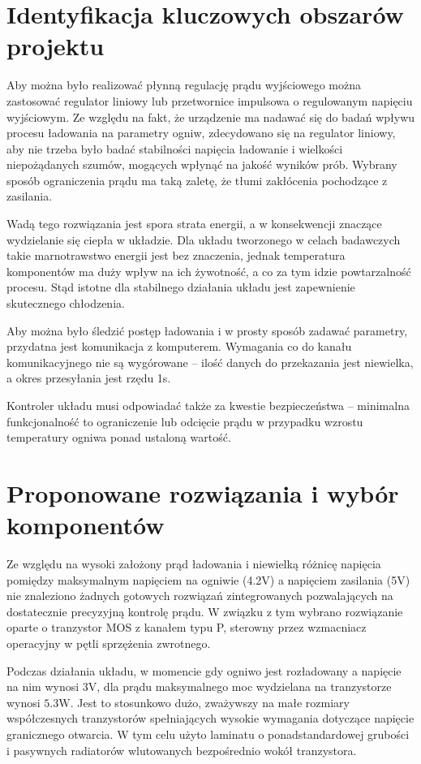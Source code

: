 \documentclass[polish,engineer]{polsl-msth}
\begin{document}
\section{Identyfikacja kluczowych obszarów projektu}
Aby można było realizować płynną regulację prądu wyjściowego można zastosować regulator liniowy lub przetwornice impulsowa o regulowanym napięciu wyjściowym. Ze względu na fakt, że urządzenie ma nadawać się do badań wpływu procesu ładowania na parametry ogniw, zdecydowano się na regulator liniowy, aby nie trzeba było badać stabilności napięcia ładowanie i wielkości niepożądanych szumów, mogących wpłynąć na jakość wyników prób. Wybrany sposób ograniczenia prądu ma taką zaletę, że tłumi zakłócenia pochodzące z zasilania.

Wadą tego rozwiązania jest spora strata energii, a w konsekwencji znaczące wydzielanie się ciepła w układzie. Dla układu tworzonego w celach badawczych takie marnotrawstwo energii jest bez znaczenia, jednak temperatura komponentów ma duży wpływ na ich żywotność, a co za tym idzie powtarzalność procesu. Stąd istotne dla stabilnego działania układu jest zapewnienie skutecznego chłodzenia.

Aby można było śledzić postęp ładowania i w prosty sposób zadawać parametry, przydatna jest komunikacja z komputerem. Wymagania co do kanału komunikacyjnego nie są wygórowane – ilość danych do przekazania jest niewielka, a okres przesyłania jest rzędu 1s.

Kontroler układu musi odpowiadać także za kwestie bezpieczeństwa – minimalna funkcjonalność to ograniczenie lub odcięcie prądu w przypadku wzrostu temperatury ogniwa ponad ustaloną wartość.

\section{Proponowane rozwiązania i wybór komponentów}
Ze względu na wysoki założony prąd ładowania i niewielką różnicę napięcia pomiędzy maksymalnym napięciem na ogniwie (4.2V) a napięciem zasilania (5V) nie znaleziono żadnych gotowych rozwiązań zintegrowanych pozwalających na dostatecznie precyzyjną kontrolę prądu. W związku z tym wybrano rozwiązanie oparte o tranzystor MOS z kanałem typu P, sterowny przez wzmacniacz operacyjny w pętli sprzężenia zwrotnego.

Podczas działania układu, w momencie gdy ogniwo jest rozładowany a napięcie na nim wynosi 3V, dla prądu maksymalnego moc wydzielana na tranzystorze wynosi $5.3\mathrm{W}$. Jest to stosunkowo dużo, zważywszy na małe rozmiary współczesnych tranzystorów spełniających wysokie wymagania dotyczące napięcie granicznego otwarcia. W tym celu użyto laminatu o ponadstandardowej grubości i pasywnych radiatorów wlutowanych bezpośrednio wokół tranzystora.
\end{document}
